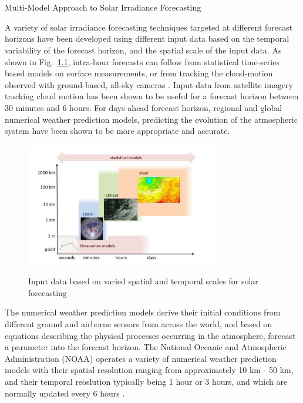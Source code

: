 \chapter{}{Multi-Model Approach to Solar Irradiance Forecasting}

A variety of solar irradiance forecasting techniques targeted at different forecast horizons have been developed using different input data based on the temporal variability of the forecast horizon, and the spatial scale of the input data. As shown in Fig.~\ref{fig:fig_variability}, intra-hour forecasts can follow from statistical time-series based models on surface measurements, or from tracking the cloud-motion observed with ground-based, all-sky cameras \cite{multimodal_intrahour}. Input data from satellite imagery tracking cloud motion has been shown to be useful for a forecast horizon between 30 minutes and 6 hours. For days-ahead forecast horizon, regional and global numerical weather prediction models, predicting the evolution of the atmospheric system have been shown to be more appropriate and accurate.

\begin{figure}[htbp]
    \begin{center}
    	\includegraphics[width=0.75\textwidth]{chapter3/fig_variability.png}
    	\label{fig:fig_variability}
    	\caption{Input data based on varied spatial and temporal scales for solar forecasting \cite{multimodel_figure1}}
    \end{center}
\end{figure}

\par The numerical weather prediction models derive their initial conditions from different ground and airborne sensors from across the world, and based on equations describing the physical processes occurring in the atmosphere, forecast a parameter into the forecast horizon. The National Oceanic and Atmospheric Administration (NOAA) operates a variety of numerical weather prediction models with their spatial resolution ranging from approximately 10 km - 50 km, and their temporal reoslution typically being 1 hour or 3 hours, and which are normally updated every 6 hours \cite{multimodel_bestpractices}. 

